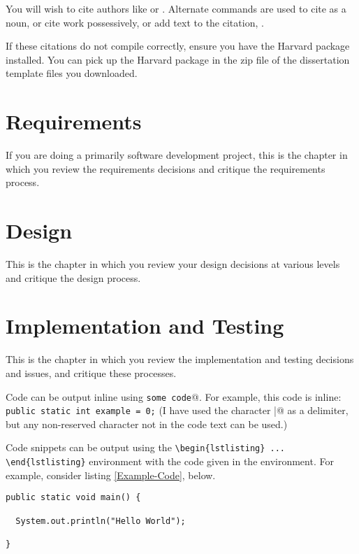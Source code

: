 \documentclass[11pt,openright,a4paper]{report}
\begin{document}
You will wish to cite authors like \cite{latex} or \cite{btxdoc}.  Alternate
commands are used to cite  as a noun, or cite
 work possessively, or add text to the citation, 
.

If these citations do not compile correctly, ensure you have the Harvard
package installed.  You can pick up the Harvard package in the zip file
of the dissertation template files you downloaded.



\chapter{Requirements}
If you are doing a primarily software development project, this is the
chapter in which you review the requirements decisions and
critique the requirements process.


\chapter{Design}
This is the chapter in which you review your design decisions at various
levels and critique the design process.


\chapter{Implementation and Testing}
This is the chapter in which you review the implementation and testing
decisions and issues, and critique these processes.

Code can be output inline using \verb@\lstinline|some code|@.  For example,
this code is inline: \lstinline|public static int example = 0;|  (I have
used the character \verb@|@ as a delimiter, but any non-reserved character
not in the code text can be used.)

Code snippets can be output using the \verb|\begin{lstlisting} ... \end{lstlisting}|
environment with the code given in the environment.  For
example, consider listing \ref{Example-Code}, below.

\begin{lstlisting}[breaklines,breakatwhitespace,caption={Example code},label=Example-Code]
public static void main() {

  System.out.println("Hello World");

}
\end{lstlisting}
\end{document}
